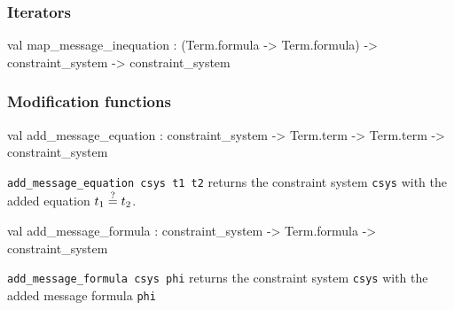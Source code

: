 \subsubsection{Iterators}




\label{val:Constraint-underscoresystem.map-underscoremessage-underscoreinequation}\begin{ocamldoccode}
val map_message_inequation :
  (Term.formula -> Term.formula) ->
  constraint_system -> constraint_system
\end{ocamldoccode}




\subsubsection{Modification functions}




\label{val:Constraint-underscoresystem.add-underscoremessage-underscoreequation}\begin{ocamldoccode}
val add_message_equation :
  constraint_system ->
  Term.term -> Term.term -> constraint_system
\end{ocamldoccode}
\begin{ocamldocdescription}
{\tt{add\_message\_equation csys t1 t2}} returns the constraint system {\tt{csys}} with the added equation $t_1 \stackrel{?}{=} t_2$. 


\end{ocamldocdescription}




\label{val:Constraint-underscoresystem.add-underscoremessage-underscoreformula}\begin{ocamldoccode}
val add_message_formula :
  constraint_system ->
  Term.formula -> constraint_system
\end{ocamldoccode}
\begin{ocamldocdescription}
{\tt{add\_message\_formula csys phi}} returns the constraint system {\tt{csys}} with the added message formula {\tt{phi}}


\end{ocamldocdescription}




